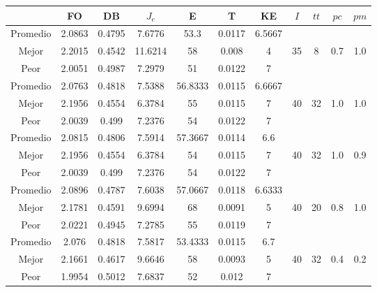 \begin{table}[h!]
    \footnotesize
    \begin{center}
        \begin{tabular}{|c|c|c|c|c|c|c|c|c|c|c|}
        \hline
             & {\bf FO} & {\bf DB} & $J_e$ & {\bf E} & {\bf T} & {\bf KE} & $I$ & $tt$ & $pc$ & $pm$ \\
        \hline
        \hline
            Promedio  & 2.0863 & 0.4795 & 7.6776 & 53.3 & 0.0117 & 6.5667 &  &  &  & \\
            \cline{1-7}
            Mejor & 2.2015 & 0.4542  & 11.6214 & 58 & 0.008 & 4 & 35 & 8 & 0.7 & 1.0\\
            \cline{1-7}
            Peor & 2.0051 & 0.4987  & 7.2979 & 51 & 0.0122 & 7 &  &  &  & \\
        \hline
        \hline
            Promedio  & 2.0763 & 0.4818 & 7.5388 & 56.8333 & 0.0115 & 6.6667 &  &  &  & \\
            \cline{1-7}
            Mejor & 2.1956 & 0.4554  & 6.3784 & 55 & 0.0115 & 7 & 40 & 32 & 1.0 & 1.0\\
            \cline{1-7}
            Peor & 2.0039 & 0.499  & 7.2376 & 54 & 0.0122 & 7 &  &  &  & \\
        \hline
        \hline
            Promedio  & 2.0815 & 0.4806 & 7.5914 & 57.3667 & 0.0114 & 6.6 &  &  &  & \\
            \cline{1-7}
            Mejor & 2.1956 & 0.4554  & 6.3784 & 54 & 0.0115 & 7 & 40 & 32 & 1.0 & 0.9\\
            \cline{1-7}
            Peor & 2.0039 & 0.499  & 7.2376 & 54 & 0.0122 & 7 &  &  &  & \\
        \hline
        \hline
            Promedio  & 2.0896 & 0.4787 & 7.6038 & 57.0667 & 0.0118 & 6.6333 &  &  &  & \\
            \cline{1-7}
            Mejor & 2.1781 & 0.4591  & 9.6994 & 68 & 0.0091 & 5 & 40 & 20 & 0.8 & 1.0\\
            \cline{1-7}
            Peor & 2.0221 & 0.4945  & 7.2785 & 55 & 0.0119 & 7 &  &  &  & \\
        \hline
        \hline
            Promedio  & 2.076 & 0.4818 & 7.5817 & 53.4333 & 0.0115 & 6.7 &  &  &  & \\
            \cline{1-7}
            Mejor & 2.1661 & 0.4617  & 9.6646 & 58 & 0.0093 & 5 & 40 & 32 & 0.4 & 0.2\\
            \cline{1-7}
            Peor & 1.9954 & 0.5012  & 7.6837 & 52 & 0.012 & 7 &  &  &  & \\

\end{tabular}
\end{center}
\end{table}
